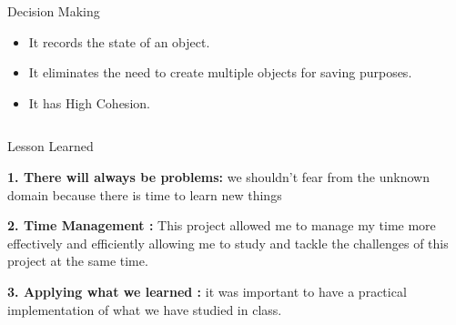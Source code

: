 \documentclass[final]{beamer}
\newlength{\onecolwid}
\newlength{\twocolwid}
\let\olditem=\item%
\renewcommand{\item}{\olditem \justifying}%
\begin{document}
\begin{frame}
\begin{columns}[t]
\begin{column}{\twocolwid}
\begin{columns}[t,totalwidth=\twocolwid]
\begin{column}{\onecolwid}
\begin{exampleblock}{Decision Making}
\begin{itemize}

\item It records the state of an object.
\item It eliminates the need to create multiple objects for saving purposes.
\item It has High Cohesion.
\end{itemize}
\end{exampleblock}


\end{column} %

\end{columns} %


\begin{alertblock}{Lesson Learned}
\justifying

\textbf{1. There will always be problems:} we shouldn't fear from the unknown domain because there is time to learn new things

\textbf{2. Time Management  :} This project allowed me to manage my time more effectively and efficiently allowing me to study and tackle the challenges of this project at the same time. 

\textbf{3. Applying what we learned  :} it was important to have a practical implementation of what we have studied in class.  

\end{alertblock} 


\begin{columns}[t,totalwidth=\twocolwid] %

\begin{column}{\onecolwid} %





\end{column}
\end{columns}
\end{column}
\end{columns}
\end{frame}
\end{document}
